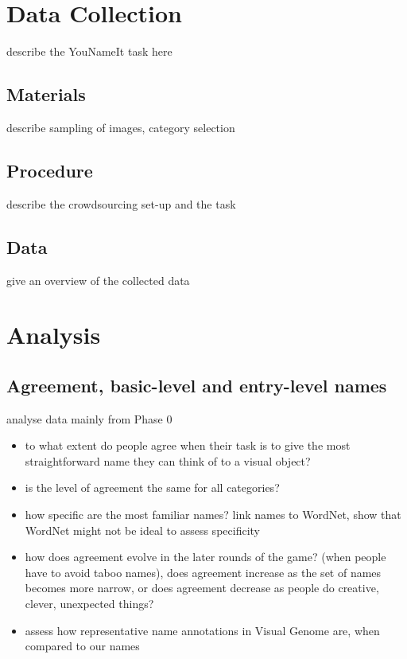 \documentclass[11pt]{article}
\begin{document}
\section{Data Collection}
\label{sec:task}

describe the YouNameIt task here

\subsection{Materials} describe sampling of images, category selection

\subsection{Procedure} describe the crowdsourcing set-up and the task

\subsection{Data} give an overview of the collected data


\section{Analysis}

\subsection{Agreement, basic-level and entry-level names}

analyse data mainly from Phase 0

\begin{itemize}
\item  to what extent do people agree when their task is to give the most straightforward name they can think of to a visual object?
\item is the level of agreement the same for all categories?
\item how specific are the most familiar names? link names to WordNet, show that WordNet might not be ideal to assess specificity
\item how does agreement evolve in the later rounds of the game? (when people have to avoid taboo names), does agreement increase as the set of names becomes more narrow, or  does agreement decrease as people do creative, clever, unexpected things?
\item assess how representative name annotations in Visual Genome are, when compared to our names
\end{itemize}
\end{document}
